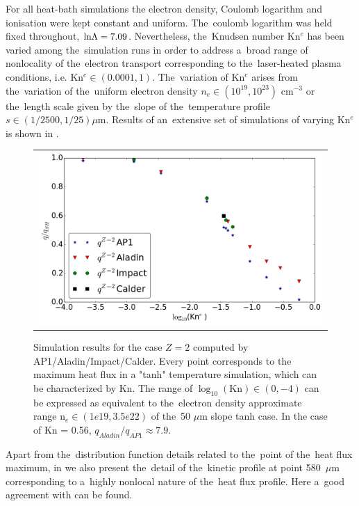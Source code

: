 For all heat-bath simulations the electron density, Coulomb logarithm and 
ionisation were kept constant and uniform.
The~coulomb logarithm was held fixed throughout, 
$\text{ln}\Lambda = 7.09$.
Nevertheless, the~Knudsen number Kn$^e$ has been varied among the~simulation 
runs in order to address a~broad range of nonlocality of 
the~electron transport corresponding 
to the~laser-heated plasma conditions, i.e. Kn$^e \in (0.0001, 1)$. 
The~variation of Kn$^e$ arises from the~variation
of the~uniform electron density $n_e \in (10^{19}, 10^{23})$ cm$^{-3}$ or 
the~length scale given by the~slope of the~temperature profile 
$s \in (1/2500, 1/25) \mu$m. Results of an~extensive set of simulations of
varying Kn$^e$ is shown in .
 
\begin{figure}[tbh]
  \begin{center}
    \begin{tabular}{c}
      \includegraphics[width=\figscale\textwidth]{Kn_results.png}
    \end{tabular}
  \caption{  
  Simulation results for the case $Z=2$ computed by AP1/Aladin/Impact/Calder.
  Every point corresponds to the maximum heat flux in a "tanh" temperature 
  simulation, which can be characterized by Kn. The range of 
  $\log_{10}(\text{Kn})\in (0, -4)$ can be expressed as equivalent 
  to the~electron density approximate range n$_e \in (1e19, 3.5e22)$ of 
  the~50 $\mu$m slope tanh case. In the case of Kn = 0.56, 
  $q_{Aladin} / q_{AP1}\approx 7.9$.}
  \label{fig:Kn_results}
  \end{center} 
\end{figure}

Apart from the~distribution function details related to the~point of 
the~heat flux maximum, in 
we also present the~detail of the~kinetic profile at point 580~$\mu$m 
corresponding to a~highly nonlocal nature of the~heat flux profile. 
Here a~good agreement with \cite{Sherlock_PoP2017} can be found.

